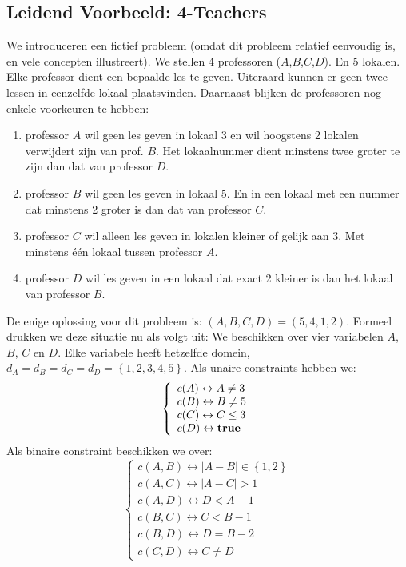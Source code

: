 \subsection{Leidend Voorbeeld: 4-Teachers}
\begin{leftbar}
We introduceren een fictief probleem (omdat dit probleem relatief eenvoudig is, en vele concepten illustreert). We stellen 4 professoren ($A$,$B$,$C$,$D$). En 5 lokalen. Elke professor dient een bepaalde les te geven. Uiteraard kunnen er geen twee lessen in eenzelfde lokaal plaatsvinden. Daarnaast blijken de professoren nog enkele voorkeuren te hebben:
\begin{enumerate}
 \item professor $A$ wil geen les geven in lokaal 3 en wil hoogstens 2 lokalen verwijdert zijn van prof. $B$. Het lokaalnummer dient minstens twee groter te zijn dan dat van professor $D$.
 \item professor $B$ wil geen les geven in lokaal 5. En in een lokaal met een nummer dat minstens 2 groter is dan dat van professor $C$.
 \item professor $C$ wil alleen les geven in lokalen kleiner of gelijk aan 3. Met minstens \'e\'en lokaal tussen professor $A$.
 \item professor $D$ wil les geven in een lokaal dat exact 2 kleiner is dan het lokaal van professor $B$.
\end{enumerate}
De enige oplossing voor dit probleem is: $\left(A,B,C,D\right)=\left(5,4,1,2\right)$. Formeel drukken we deze situatie nu als volgt uit: We beschikken over vier variabelen $A$, $B$, $C$ en $D$. Elke variabele heeft hetzelfde domein, $d_A=d_B=d_C=d_D=\left\{1,2,3,4,5\right\}$. Als unaire constraints hebben we:
\begin{equation}
\left\{\begin{array}{l}
c(A)\leftrightarrow A\neq 3\\
c(B)\leftrightarrow B\neq 5\\
c(C)\leftrightarrow C\leq 3\\
c(D)\leftrightarrow \mbox{\bf true}
\end{array}\right.
\end{equation}
Als binaire constraint beschikken we over:
\begin{equation}
\left\{\begin{array}{l}
c(A,B)\leftrightarrow\left|A-B\right|\in\left\{1,2\right\}\\
c(A,C)\leftrightarrow\left|A-C\right|>1\\
c(A,D)\leftrightarrow D<A-1\\
c(B,C)\leftrightarrow C<B-1\\
c(B,D)\leftrightarrow D=B-2\\
c(C,D)\leftrightarrow C\neq D
\end{array}\right.
\end{equation}
\end{leftbar}
